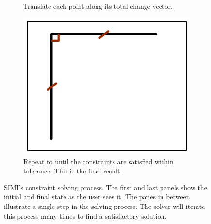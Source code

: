 \begin{figure}
\begin{subfigure}[t]{51mm}
    \caption{Translate each point along its total change vector.}
    \label{fig:solving-total-change}
  \end{subfigure}
  \hspace{1mm} %
  \begin{subfigure}[t]{51mm}
    \includegraphics[width=\linewidth]{img/solving-final.pdf}
    \caption{Repeat \textit{} to
      \textit{} until the constraints
      are satisfied within tolerance. This is the final result.}
    \label{fig:solving-final}
  \end{subfigure}
  \caption[Constraint Solver Illustration]{SIMI's constraint solving
    process. The first and last panels show the initial and final
    state as the user sees it. The panes in between illustrate a
    single step in the solving process. The solver will iterate this
    process many times to find a satisfactory solution.}
  \label{fig:solving}
\end{figure}
